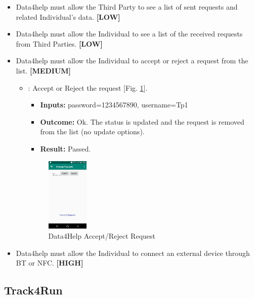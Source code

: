 \documentclass[a4paper, hidelinks, 12pt]{report}
\newcommand\requirement[1]{\item[{[REQ-#1]}] }
\newcommand\test[1]{\item[{[TEST-#1]}] }
\begin{document}
\begin{itemize}
\begin{itemize}
	\end{itemize}

	\requirement{14} Data4help must allow the Third Party to see a list of sent requests and related Individual’s data. \textbf{[LOW]}
	\requirement{15} Data4help must allow the Individual to see a list of the received requests from Third Parties. \textbf{[LOW]}
	\requirement{16} Data4help must allow the Individual to accept or reject a request from the list. \textbf{[MEDIUM]}
			
				\begin{itemize}
		\test{13}: Accept or Reject the request [Fig. \ref{fig:request_acceptreject}].
			\begin{itemize}
			\item \textbf{Inputs: } password=1234567890, username=Tp1			
			\item \textbf{Outcome: } Ok. The status is updated and the request is removed from the list (no update options).
			\item \textbf{Result: } Passed. 
			\end{itemize}		
			
		\begin{figure}[H]
					\centering
				\includegraphics[width=0.2\textwidth]{images/manage_requests.jpeg}
					\caption[Data4Help Accept/Reject Request]{Data4Help Accept/Reject Request}
				\label{fig:request_acceptreject}
			\end{figure}

	\end{itemize}
	
	\requirement{17} Data4help must allow the Individual to connect an external device through BT or NFC. \textbf{[HIGH]}
	\end{itemize}
	
	\subsection{Track4Run}
	
\end{document}
